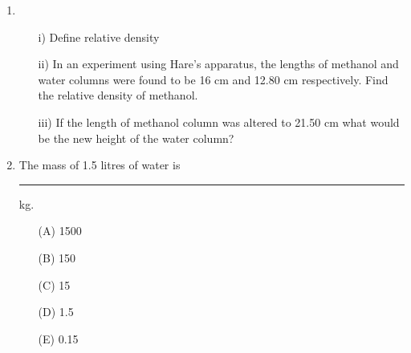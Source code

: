 \begin{enumerate}
	\item
	\begin{enumerate}[topsep=0ex,itemsep=0ex,partopsep=1ex,parsep=1ex]
		\item[i)] Define relative density
		\item[ii)] In an experiment using Hare's apparatus, the lengths of methanol and water columns were found to be 16 cm and 12.80 cm respectively. Find the relative density of methanol. 
		\item[iii)] If the length of methanol column was altered to 21.50 cm what would be the new height of the water column?
	\end{enumerate}
	
	\item The mass of 1.5 litres of water is \rule{1.5cm}{0.15mm} kg.
	\begin{enumerate}[topsep=0ex,itemsep=0ex,partopsep=1ex,parsep=1ex]
		\item[(A)] 1500
		\item[(B)] 150
		\item[(C)] 15
		\item[(D)] 1.5
		\item[(E)] 0.15
	\end{enumerate}

\end{enumerate}











